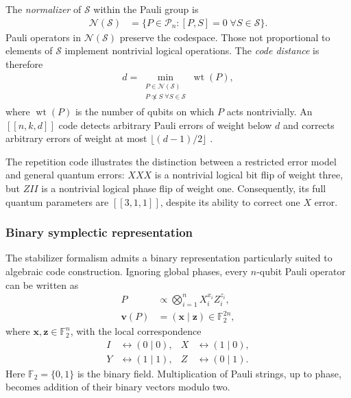 \documentclass[amssymb,twocolumn,aps]{revtex4-2}
\begin{document}
The \textit{normalizer} of $\mathcal S$ within the Pauli group is
\begin{align*}
    \mathcal N(\mathcal S)
    &=\{P\in\mathcal P_n:[P,S]=0
       \;\forall S\in\mathcal S\}.
\end{align*}
Pauli operators in $\mathcal N(\mathcal S)$ preserve the codespace. Those not proportional to elements of $\mathcal S$ implement nontrivial logical operations. The \textit{code distance} is therefore
\begin{align*}
    d=\min_{\substack{P\in\mathcal N(\mathcal S)\\
                P\not\propto S\;\forall S\in\mathcal S}}
                \operatorname{wt}(P),
\end{align*}
where $\operatorname{wt}(P)$ is the number of qubits on which $P$ acts nontrivially. An $[[n,k,d]]$ code detects arbitrary Pauli errors of weight below $d$ and corrects arbitrary errors of weight at most $\lfloor(d-1)/2\rfloor$ \cite{terhal2015quantum,gottesman2024surviving}.

The repetition code illustrates the distinction between a restricted error model and general quantum errors: $XXX$ is a nontrivial logical bit flip of weight three, but $ZII$ is a nontrivial logical phase flip of weight one. Consequently, its full quantum parameters are $[[3,1,1]]$, despite its ability to correct one $X$ error.

\subsubsection*{Binary symplectic representation}

The stabilizer formalism admits a binary representation particularly suited to algebraic code construction. Ignoring global phases, every $n$-qubit Pauli operator can be written as
\begin{align*}
    P&\propto\bigotimes_{i=1}^{n}X_i^{x_i}Z_i^{z_i},\\
    \mathbf v(P)&=(\mathbf x\mid\mathbf z)
    \in\mathbb F_2^{2n},
\end{align*}
where $\mathbf x,\mathbf z\in\mathbb F_2^n$, with the local correspondence
\begin{align*}
    I&\leftrightarrow(0\mid0), &
    X&\leftrightarrow(1\mid0),\\
    Y&\leftrightarrow(1\mid1), &
    Z&\leftrightarrow(0\mid1).
\end{align*}
Here $\mathbb F_2=\{0,1\}$ is the binary field. Multiplication of Pauli strings, up to phase, becomes addition of their binary vectors modulo two.
\end{document}
